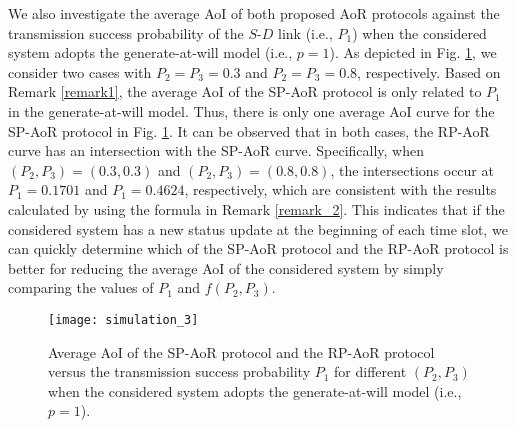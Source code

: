 \documentclass{IEEEtran}
\begin{document}
We also investigate the average AoI of both proposed AoR protocols against the transmission success probability of the $S$-$D$ link (i.e., $P_1$) when the considered system adopts the generate-at-will model (i.e., $p=1$). As depicted in Fig. \ref{simulation_3}, we consider two cases with $P_2=P_3=0.3$ and $P_2=P_3=0.8$, respectively. Based on Remark \ref{remark1}, the average AoI of the SP-AoR protocol is only related to $P_1$ in the generate-at-will model. Thus, there is only one average AoI curve for the SP-AoR protocol in Fig. \ref{simulation_3}. It can be observed that in both cases, the RP-AoR curve has an intersection with the SP-AoR curve. Specifically, when $(P_2,P_3)=(0.3,0.3)$ and $(P_2,P_3)=(0.8,0.8)$, the intersections occur at $P_1=0.1701$ and $P_1=0.4624$, respectively, which are consistent with the results calculated by using the formula in Remark \ref{remark_2}. This indicates that if the considered system has a new status update at the beginning of each time slot, we can quickly determine which of the SP-AoR protocol and the RP-AoR protocol is better for reducing the average AoI of the considered system by simply comparing the values of $P_1$ and $f(P_2,P_3)$.

\begin{figure}
	\centering
	\texttt{[image: simulation\_3]}
	\caption{Average AoI of the SP-AoR protocol and the RP-AoR protocol versus the transmission success probability $P_1$ for different $(P_2, P_3)$ when the considered system adopts the generate-at-will model (i.e., $p=1$).}
	\label{simulation_3}
\end{figure}

 








\end{document}
